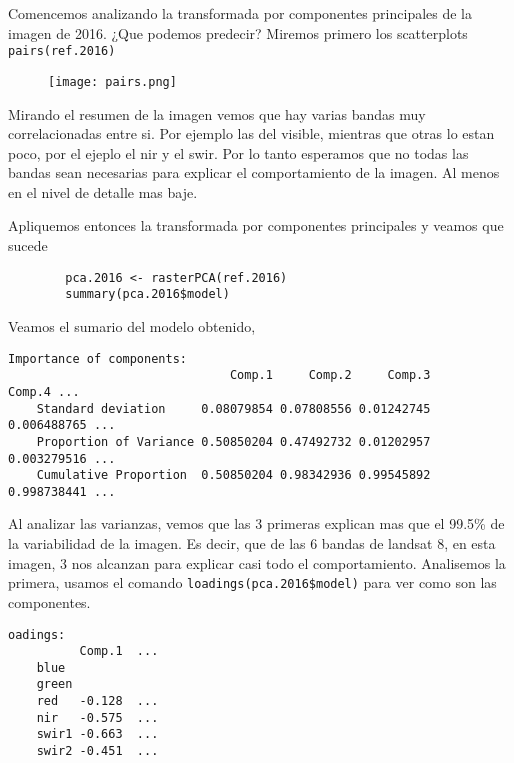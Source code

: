 \begin{exa}
    Comencemos analizando la transformada por componentes principales de la
    imagen de 2016. ¿Que podemos predecir? Miremos primero los
    scatterplots \texttt{pairs(ref.2016)}
    \begin{figure}[h!]
    \begin{center}
        \texttt{[image: pairs.png]}
    \end{center}
    \caption{}
    \label{fig:pairs}
    \end{figure}

    Mirando el resumen de la imagen vemos que hay varias bandas muy
    correlacionadas entre si. Por ejemplo las del visible, mientras que otras lo
    estan poco, por el ejeplo el nir y el swir. Por lo tanto esperamos que no
    todas las bandas sean necesarias para explicar el comportamiento de la
    imagen. Al menos en el nivel de detalle mas baje.

    Apliquemos entonces la transformada por componentes principales y veamos que
    sucede

    \begin{lstlisting}
        pca.2016 <- rasterPCA(ref.2016)
        summary(pca.2016$model)
    \end{lstlisting}

    Veamos el sumario del modelo obtenido,
    \begin{Verbatim}[fontsize=\small]
    Importance of components:
                               Comp.1     Comp.2     Comp.3      Comp.4 ...
    Standard deviation     0.08079854 0.07808556 0.01242745 0.006488765 ...
    Proportion of Variance 0.50850204 0.47492732 0.01202957 0.003279516 ...
    Cumulative Proportion  0.50850204 0.98342936 0.99545892 0.998738441 ...
    \end{Verbatim}

    Al analizar las varianzas, vemos que las 3 primeras explican mas que el
    99.5\% de la variabilidad de la imagen. Es decir, que de las 6 bandas de
    landsat 8, en esta imagen, 3 nos alcanzan para explicar casi todo el
    comportamiento. Analisemos la primera, usamos el comando
    \texttt{loadings(pca.2016\$model)} para ver como son las componentes.

    \begin{Verbatim}[fontsize=\small]
    oadings:
          Comp.1  ...
    blue
    green
    red   -0.128  ...
    nir   -0.575  ...
    swir1 -0.663  ...
    swir2 -0.451  ...
    \end{Verbatim}


\end{exa}
